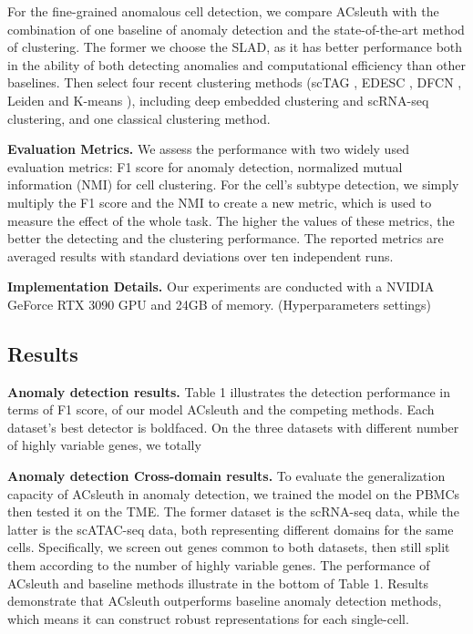 \documentclass{article}
\begin{document}
For the fine-grained anomalous cell detection, we compare ACsleuth with the combination of one baseline of 
anomaly detection and the state-of-the-art method of clustering. The former we choose the 
SLAD, as it has better performance both in the ability of both detecting anomalies and 
computational efficiency than other baselines. Then select four recent clustering methods 
(scTAG \cite{scTAG}, EDESC \cite{EDESC}, DFCN \cite{DFCN}, Leiden \cite{leiden} 
and K-means \cite{kmeans}), including deep embedded clustering and scRNA-seq 
clustering, and one classical clustering method. 

\textbf{Evaluation Metrics.}	We assess the performance with two widely used evaluation metrics: 
F1 score for anomaly detection, normalized mutual information (NMI) for cell clustering. 
For the cell’s subtype detection, we simply multiply the F1 score and the NMI to create 
a new metric, which is used to measure the effect of the whole task. The higher the values 
of these metrics, the better the detecting and the clustering performance. The reported 
metrics are averaged results with standard deviations over ten independent runs.

\textbf{Implementation Details.} 	Our experiments are conducted with a 
NVIDIA GeForce RTX 3090 GPU and 24GB of memory.  (Hyperparameters settings)

\subsection{Results}
\textbf{Anomaly detection results.}	Table 1 illustrates the detection performance in terms of 
F1 score, of our model ACsleuth and the competing methods. Each dataset’s best detector is 
boldfaced. On the three datasets with different number of highly variable genes, we totally 

\textbf{Anomaly detection Cross-domain results.}	To evaluate the generalization capacity of ACsleuth 
in anomaly detection, we trained the model on the PBMCs then tested it on the TME. The 
former dataset is the scRNA-seq data, while the latter is the scATAC-seq data, both 
representing different domains for the same cells. Specifically, we screen out genes 
common to both datasets, then still split them according to the number of highly variable 
genes. The performance of ACsleuth and baseline methods illustrate in the bottom of Table 1. Results 
demonstrate that ACsleuth outperforms baseline anomaly detection methods, which means it can 
construct robust representations for each single-cell.
\end{document}
